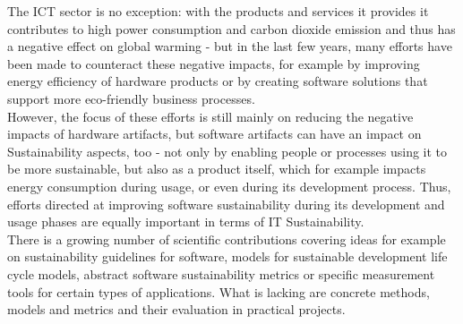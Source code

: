 \documentclass[oribibl]{llncs}
\begin{document}
The ICT sector is no exception: with the products and services it provides it contributes to high power consumption and carbon dioxide emission %
and thus has a negative effect on global warming \cite{smart2020} %
- but in the last few years, many efforts have been made to counteract these negative impacts, for example by improving energy efficiency of hardware products or by creating software solutions that support more eco-friendly business processes.\\
However, the focus of these efforts is still mainly on reducing the negative impacts of hardware artifacts, %
 but software artifacts can have an impact on Sustainability aspects, too - not only by enabling people or processes using it to be more sustainable, but also as a product itself, which for example impacts energy consumption during usage, or even during its development process. %
Thus, efforts directed at improving software sustainability during its development and usage phases are equally important in terms of IT Sustainability.\\
There is a growing number of scientific contributions covering ideas for example on sustainability guidelines for software, models for sustainable development life cycle models, abstract software sustainability metrics or specific measurement tools for certain types of applications. %
What is lacking %
are %
concrete methods, models and metrics and their evaluation in practical projects. %
\end{document}
